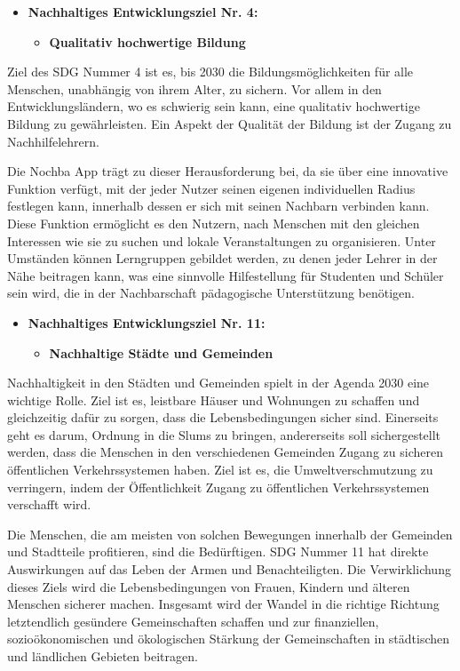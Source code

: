 \begin{itemize}
    \item \textbf{Nachhaltiges Entwicklungsziel Nr. 4:}
    \begin{itemize}
        \item \textbf{Qualitativ hochwertige Bildung}
    \end{itemize}
\end{itemize}

Ziel des SDG Nummer 4 ist es, bis 2030 die Bildungsmöglichkeiten für alle Menschen, unabhängig von ihrem Alter, zu sichern. Vor allem in den Entwicklungsländern, wo es schwierig sein kann, eine qualitativ hochwertige Bildung zu gewährleisten. Ein Aspekt der Qualität der Bildung ist der Zugang zu Nachhilfelehrern. 

Die Nochba App trägt zu dieser Herausforderung bei, da sie über eine innovative Funktion verfügt, mit der jeder Nutzer seinen eigenen individuellen Radius festlegen kann, innerhalb dessen er sich mit seinen Nachbarn verbinden kann. Diese Funktion ermöglicht es den Nutzern, nach Menschen mit den gleichen Interessen wie sie zu suchen und lokale Veranstaltungen zu organisieren. Unter Umständen können Lerngruppen gebildet werden, zu denen jeder Lehrer in der Nähe beitragen kann, was eine sinnvolle Hilfestellung für Studenten und Schüler sein wird, die in der Nachbarschaft pädagogische Unterstützung benötigen.

\begin{itemize}
    \item \textbf{Nachhaltiges Entwicklungsziel Nr. 11:}
    \begin{itemize}
        \item \textbf{Nachhaltige Städte und Gemeinden}
    \end{itemize}
\end{itemize}

Nachhaltigkeit in den Städten und Gemeinden spielt in der Agenda 2030 eine wichtige Rolle. Ziel ist es, leistbare Häuser und Wohnungen zu schaffen und gleichzeitig dafür zu sorgen, dass die Lebensbedingungen sicher sind. Einerseits geht es darum, Ordnung in die Slums zu bringen, andererseits soll sichergestellt werden, dass die Menschen in den verschiedenen Gemeinden Zugang zu sicheren öffentlichen Verkehrssystemen haben. Ziel ist es, die Umweltverschmutzung zu verringern, indem der Öffentlichkeit Zugang zu öffentlichen Verkehrssystemen verschafft wird. 

Die Menschen, die am meisten von solchen Bewegungen innerhalb der Gemeinden und Stadtteile profitieren, sind die Bedürftigen. SDG Nummer 11 hat direkte Auswirkungen auf das Leben der Armen und Benachteiligten. Die Verwirklichung dieses Ziels wird die Lebensbedingungen von Frauen, Kindern und älteren Menschen sicherer machen. Insgesamt wird der Wandel in die richtige Richtung letztendlich gesündere Gemeinschaften schaffen und zur finanziellen, sozioökonomischen und ökologischen Stärkung der Gemeinschaften in städtischen und ländlichen Gebieten beitragen.  

